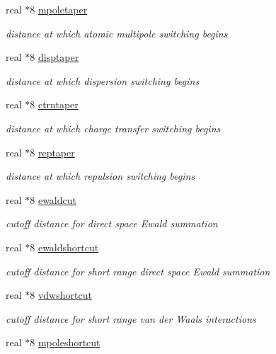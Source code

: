 \begin{DoxyCompactItemize}
real $\ast$8 \hyperlink{classcutoff_ac0a584dd1ffef51acf707a06832a162a}{mpoletaper}
\begin{DoxyCompactList}\small\item\em distance at which atomic multipole switching begins \end{DoxyCompactList}\item 
real $\ast$8 \hyperlink{classcutoff_a74f0ed5f2cad112e7fe50f24904d9e89}{disptaper}
\begin{DoxyCompactList}\small\item\em distance at which dispersion switching begins \end{DoxyCompactList}\item 
real $\ast$8 \hyperlink{classcutoff_a1c579ced91600e8e2a6fce114f29f34c}{ctrntaper}
\begin{DoxyCompactList}\small\item\em distance at which charge transfer switching begins \end{DoxyCompactList}\item 
real $\ast$8 \hyperlink{classcutoff_a9b8b3c87cffb3131d08ddccc32c52699}{reptaper}
\begin{DoxyCompactList}\small\item\em distance at which repulsion switching begins \end{DoxyCompactList}\item 
real $\ast$8 \hyperlink{classcutoff_a5130b26d222b11d50434f8479f00cf6a}{ewaldcut}
\begin{DoxyCompactList}\small\item\em cutoff distance for direct space Ewald summation \end{DoxyCompactList}\item 
real $\ast$8 \hyperlink{classcutoff_a117f3f3df84668290ed7eb7abe941030}{ewaldshortcut}
\begin{DoxyCompactList}\small\item\em cutoff distance for short range direct space Ewald summation \end{DoxyCompactList}\item 
real $\ast$8 \hyperlink{classcutoff_abf62f41b2e876715123765edd145d64b}{vdwshortcut}
\begin{DoxyCompactList}\small\item\em cutoff distance for short range van der Waals interactions \end{DoxyCompactList}\item 
real $\ast$8 \hyperlink{classcutoff_ab982e131198b9a6e6b13aecf3c2e479f}{mpoleshortcut}

\end{DoxyCompactItemize}
